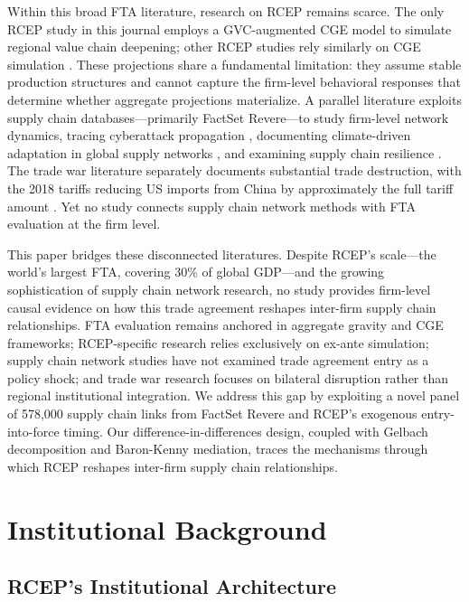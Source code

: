 \documentclass[preprint,12pt,authoryear]{elsarticle}
\begin{document}
Within this broad FTA literature, research on RCEP remains scarce. The only RCEP study in this journal employs a GVC-augmented CGE model to simulate regional value chain deepening; other RCEP studies rely similarly on CGE simulation \citep{sun2023estimating,petri2020rcep}. These projections share a fundamental limitation: they assume stable production structures and cannot capture the firm-level behavioral responses that determine whether aggregate projections materialize. A parallel literature exploits supply chain databases---primarily FactSet Revere---to study firm-level network dynamics, tracing cyberattack propagation \citep{crosignani2022pirates}, documenting climate-driven adaptation in global supply networks \citep{pankratz2023climate}, and examining supply chain resilience \citep{alfaro2023global}. The trade war literature separately documents substantial trade destruction, with the 2018 tariffs reducing US imports from China by approximately the full tariff amount \citep{fajgelbaum2020return}. Yet no study connects supply chain network methods with FTA evaluation at the firm level.

This paper bridges these disconnected literatures. Despite RCEP's scale---the world's largest FTA, covering 30\% of global GDP---and the growing sophistication of supply chain network research, no study provides firm-level causal evidence on how this trade agreement reshapes inter-firm supply chain relationships. FTA evaluation remains anchored in aggregate gravity and CGE frameworks; RCEP-specific research relies exclusively on ex-ante simulation; supply chain network studies have not examined trade agreement entry as a policy shock; and trade war research focuses on bilateral disruption rather than regional institutional integration. We address this gap by exploiting a novel panel of 578,000 supply chain links from FactSet Revere and RCEP's exogenous entry-into-force timing. Our difference-in-differences design, coupled with Gelbach decomposition and Baron-Kenny mediation, traces the mechanisms through which RCEP reshapes inter-firm supply chain relationships.

\section{Institutional Background}
\label{sec:background}

\subsection{RCEP's Institutional Architecture}
\end{document}
